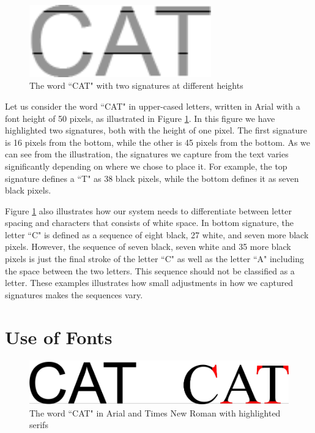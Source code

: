 \begin{figure}[ht]
    \centering
    \includegraphics[width=0.7\textwidth]{fig/chapter2/signature_multiple.png}
    \caption{The word ``CAT" with two signatures at different heights}
    \label{fig:thesis-signature-comparison}
\end{figure}

Let us consider the word ``CAT" in upper-cased letters, written in Arial with a font height of 50 pixels, as illustrated in Figure \ref{fig:thesis-signature-comparison}. In this figure we have highlighted two signatures, both with the height of one pixel. The first signature is 16 pixels from the bottom, while the other is 45 pixels from the bottom. As we can see from the illustration, the signatures we capture from the text varies significantly depending on where we chose to place it. For example, the top signature defines a ``T" as 38 black pixels, while the bottom defines it as seven black pixels.

Figure \ref{fig:thesis-signature-comparison} also illustrates how our system needs to differentiate between letter spacing and characters that consists of white space. In bottom signature, the letter ``C" is defined as a sequence of eight black, 27 white, and seven more black pixels. However, the sequence of seven black, seven white and 35 more black pixels is just the final stroke of the letter ``C" as well as the letter ``A" including the space between the two letters. This sequence should not be classified as a letter. These examples illustrates how small adjustments in how we captured signatures makes the sequences vary.


\section{Use of Fonts}
\label{sec:use_of_fonts}

\begin{figure}[h]
    \centering
    \includegraphics[width=1.0\textwidth]{fig/chapter2/typeface_comparison.png}
    \caption{The word ``CAT" in Arial and Times New Roman with highlighted serifs}
    \label{fig:typeface-comparison}
\end{figure}

